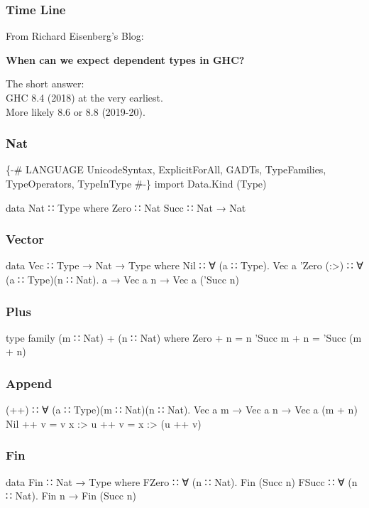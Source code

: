 \documentclass{beamer}
\begin{document}
\begin{frame}\frametitle{Time Line}
From Richard Eisenberg's Blog:

\bigskip

\textbf{When can we expect dependent types in GHC?}

\bigskip

The short answer:\\
GHC 8.4 (2018) at the very earliest.\\
More likely 8.6 or 8.8 (2019-20).
\end{frame}

\begin{frame}[fragile]\frametitle{Nat}
\begin{semiverbatim}
\{-# LANGUAGE UnicodeSyntax, ExplicitForAll, GADTs,
              TypeFamilies, TypeOperators, TypeInType #-\}
import Data.Kind (Type)

data Nat ∷ Type where
  Zero ∷ Nat
  Succ ∷ Nat → Nat
\end{semiverbatim}
\end{frame}

\begin{frame}[fragile]\frametitle{Vector}
\begin{semiverbatim}
data Vec ∷ Type → Nat → Type where
  Nil  ∷ ∀ (a ∷ Type). Vec a 'Zero
  (:>) ∷ ∀ (a ∷ Type)(n ∷ Nat).
    a → Vec a n → Vec a ('Succ n)
\end{semiverbatim}
\end{frame}

\begin{frame}[fragile]\frametitle{Plus}
\begin{semiverbatim}
type family (m ∷ Nat) + (n ∷ Nat) where
  Zero    + n = n
  'Succ m + n = 'Succ (m + n)
\end{semiverbatim}
\end{frame}

\begin{frame}[fragile]\frametitle{Append}
\begin{semiverbatim}
(++) ∷ ∀ (a ∷ Type)(m ∷ Nat)(n ∷ Nat).
        Vec a m → Vec a n → Vec a (m + n)
Nil    ++ v = v
x :> u ++ v = x :> (u ++ v)
\end{semiverbatim}
\end{frame}

\begin{frame}[fragile]\frametitle{Fin}
\begin{semiverbatim}
data Fin ∷ Nat → Type where
  FZero ∷ ∀ (n ∷ Nat).         Fin (Succ n)
  FSucc ∷ ∀ (n ∷ Nat). Fin n → Fin (Succ n)
\end{semiverbatim}
\end{frame}
\end{document}

